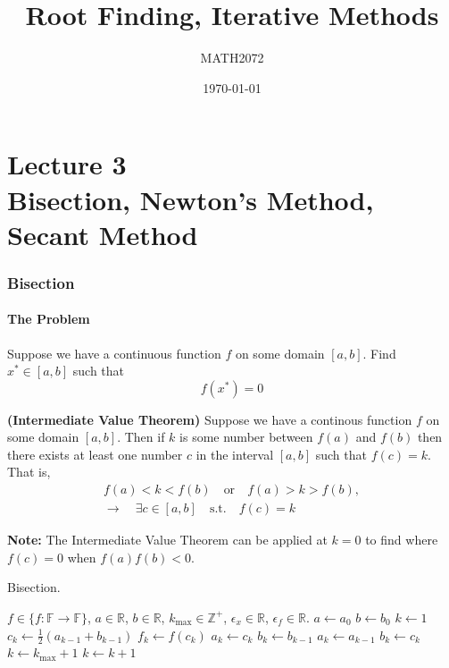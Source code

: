 \documentclass{article}
\title{Root Finding, Iterative Methods}
\author{MATH2072}
\date{\today}
\newenvironment{theorem}
	{\definecolor{shadethmcolor}{HTML}{EDF8FF}\definecolor{shaderulecolor}{HTML}{45CFFF}\setlength{\shadeboxrule}{.4pt}\begin{prototheorem}\normalfont}
	{\end{prototheorem}}
\begin{document}
\part*{Lecture 3\\Bisection, Newton's Method, Secant Method}

\section*{Bisection}
\subsection*{The Problem}
Suppose we have a continuous function $f$ on some domain $[a,b]$. Find $x^*\in[a,b]$ such that
\[
	f(x^*)=0
\]

\begin{theorem}
\textbf{(Intermediate Value Theorem) } Suppose we have a continous function $f$ on some domain $[a,b]$. Then if $k$ is some number between $f(a)$ and $f(b)$ then there exists at least one number $c$ in the interval $[a,b]$ such that $f(c)=k$. That is,
\[
\begin{aligned}
f(a)<k<f(b)\quad\text{or}\quad f(a)>k>f(b), \\
\to\quad\exists c\in [a,b]\quad\text{s.t.}\quad f(c)=k
\end{aligned}
\]
\end{theorem}
\vspace{1.5in}
\textbf{Note:} The Intermediate Value Theorem can be applied at $k=0$ to find where $f(c)=0$ when $f(a)f(b) < 0$. 
\begin{algorithm}
\caption{Bisection.}\label{alg:bisect}
\begin{algorithmic}
\Require $f\in\{f:\mathbb{F}\to\mathbb{F}\}$, $a\in\mathbb{R}$, $b\in\mathbb{R}$, $k_\text{max}\in\mathbb{Z}^+$, $\epsilon_x\in\mathbb{R}$, $\epsilon_f\in\mathbb{R}$.
\State $a \gets a_0$
\State $b \gets b_0$
\State $k \gets 1$
	\State $c_k \gets \frac{1}{2}(a_{k-1} + b_{k - 1})$
	\State $f_k \gets f(c_k)$
		\State $a_k \gets c_k$
		\State $b_k \gets b_{k-1}$
	\Else
		\State $a_k \gets a_{k-1}$
		\State $b_k \gets c_k$
	\EndIf
		\State $k \gets k_\text{max} + 1$
	\EndIf
	\State $k \gets k + 1$
\EndWhile
\end{algorithmic}
\end{algorithm}
\end{document}
